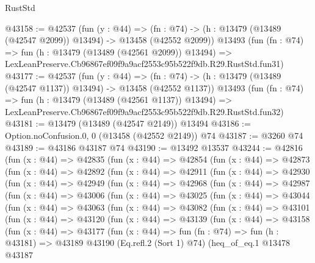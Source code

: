 \begin{lexlean}{RustStd}
\begin{coremodule}
@43158 := @42537
    (fun (y : @44) =>
    (fn : @74) -> (h : @13479 (@13489 (@42547 @2099)) @13494) -> @13458 (@42552 @2099))
    @13493
    (fun (fn : @74) =>
    fun (h : @13479 (@13489 (@42561 @2099)) @13494) =>
    LexLeanPreserve.Cb96867ef09f9a9acf2553c95b522f9db.R29.RustStd.fun31)
@43177 := @42537
    (fun (y : @44) =>
    (fn : @74) -> (h : @13479 (@13489 (@42547 @1137)) @13494) -> @13458 (@42552 @1137))
    @13493
    (fun (fn : @74) =>
    fun (h : @13479 (@13489 (@42561 @1137)) @13494) =>
    LexLeanPreserve.Cb96867ef09f9a9acf2553c95b522f9db.R29.RustStd.fun32)
@43181 := @13479 (@13489 (@42547 @2149)) @13494
@43186 := Option.noConfusion.{0, 0} (@13458 (@42552 @2149)) @74
@43187 := @3260 @74
@43189 := @43186 @43187 @74
@43190 := @13492 @13537
@43244 := @42816
    (fun (x : @44) =>
    @42835
      (fun (x : @44) =>
      @42854
        (fun (x : @44) =>
        @42873
          (fun (x : @44) =>
          @42892
            (fun (x : @44) =>
            @42911
              (fun (x : @44) =>
              @42930
                (fun (x : @44) =>
                @42949
                  (fun (x : @44) =>
                  @42968
                    (fun (x : @44) =>
                    @42987
                      (fun (x : @44) =>
                      @43006
                        (fun (x : @44) =>
                        @43025
                          (fun (x : @44) =>
                          @43044
                            (fun (x : @44) =>
                            @43063
                              (fun (x : @44) =>
                              @43082
                                (fun (x : @44) =>
                                @43101
                                  (fun (x : @44) =>
                                  @43120
                                    (fun (x : @44) =>
                                    @43139
                                      (fun (x : @44) =>
                                      @43158
                                        (fun (x : @44) =>
                                        @43177
                                          (fun (x : @44) =>
                                          fun (fn : @74) =>
                                          fun (h : @43181) =>
                                          @43189
                                            @43190
                                            (Eq.refl.{2} (Sort 1) @74)
                                            (heq_of_eq.{1}
                                              @13478
                                              @43187

\end{coremodule}
\end{lexlean}
